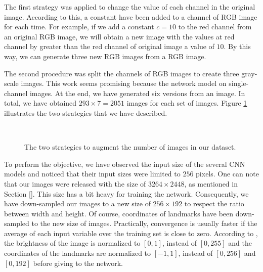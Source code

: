 \documentclass[review]{elsarticle}
\begin{document}
The first strategy was applied to change the value of each channel in the original image. According to this, a constant have been added to a channel of RGB image for each time. For example, if we add a constant $c = 10$ to the red channel from an original RGB image, we will obtain a new image with the values at red channel by greater than the red channel of original image a value of $10$. By this way, we can generate three new RGB images from a RGB image.

The second procedure was split the channels of RGB images to create three gray-scale images. This work seems promising because the network model on single-channel images. At the end, we have generated six versions from an image. In total, we have obtained $293 \times 7 = 2051$ images for each set of images. Figure \ref{figdataauge} illustrates the two strategies that we have described.

\begin{figure}[h!]
    \centering
    ~~
    \caption{The two strategies to augment the number of images in our dataset.}
    \label{figdataauge}
\end{figure}

To perform the objective, we have observed the input size of the several CNN models and noticed that their input sizes were limited to $256$ pixels. One can note that our images were released with the size of $3264 \times 2448$, as mentioned in Section \ref{}. This size has a bit heavy for training the network. Consequently, we have down-sampled our images to a new size of $256 \times 192$ to respect the ratio between width and height. Of course, coordinates of landmarks have been down-sampled to the new size of images. Practically, convergence is usually faster if the average of each input variable over the training set is close to zero. According to \cite{lecun2012efficient}, the brightness of the image is normalized to $[0,1]$, instead of $[0,255]$ and the coordinates of the landmarks are normalized to $[-1,1]$, instead of $[0,256]$ and $[0,192]$ before giving to the network.
\end{document}
